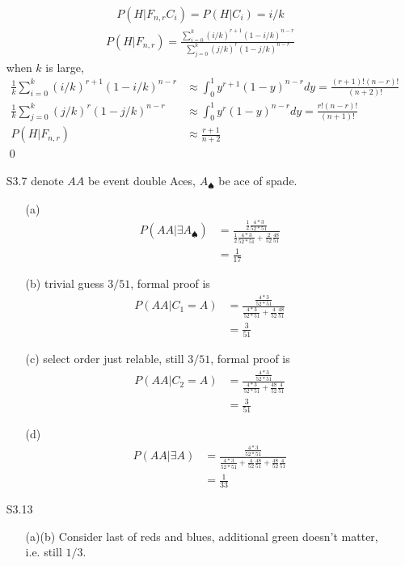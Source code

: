 \documentclass[paper=a4, fontsize=11pt]{scrartcl} %
\numberwithin{equation}{section} %
\numberwithin{figure}{section} %
\numberwithin{table}{section} %
\begin{document}
\begin{itemize}
\begin{align}
		P(H|F_{n,r} C_i) = P(H|C_i) = i/k
	\end{align}
	\begin{align}
		P(H|F_{n,r}) = \frac{\sum_{i=0}^k(i/k)^{r+1}(1-i/k)^{n-r} }{\sum_{j=0}^k(j/k)^r(1-j/k)^{n-r}}
	\end{align}
	when $k$ is large,
	\begin{align}
		\frac{1}{k}\sum_{i=0}^k(i/k)^{r+1}(1-i/k)^{n-r} &\approx \int_0^1 y^{r+1}(1-y)^{n-r}dy = \frac{(r+1)!(n-r)!}{(n+2)!}\\
		\frac{1}{k}\sum_{j=0}^k(j/k)^{r}(1-j/k)^{n-r} &\approx \int_0^1 y^{r}(1-y)^{n-r}dy = \frac{r!(n-r)!}{(n+1)!}\\
		P(H|F_{n,r}) &\approx \frac{r+1}{n+2}
	\end{align}\qed
	\item[S3.7] denote $AA$ be event double Aces, $A_\spadesuit$ be ace of spade.
	\begin{itemize}
		\item[(a)]
		\begin{align}
			P(AA|\exists A_\spadesuit) &= \frac{\frac{1}{2} \frac{4*3}{52*51}}{\frac{1}{2} \frac{4*3}{52*51} + \frac{2}{52}\frac{48}{51}}\\
				&= \frac{1}{17}
		\end{align}
		\item[(b)] trivial guess $3/51$, formal proof is
		\begin{align}
			P(AA|C_1=A) &= \frac{\frac{4*3}{52*51}}{\frac{4*3}{52*51} + \frac{4}{52}\frac{48}{51}}\\
					&= \frac{3}{51}
		\end{align}
		\item[(c)] select order just relable, still $3/51$, formal proof is
		\begin{align}
			P(AA|C_2=A) &= \frac{\frac{4*3}{52*51}}{\frac{4*3}{52*51} + \frac{48}{52}\frac{4}{51}}\\
					&= \frac{3}{51}
		\end{align}
		\item[(d)] 
		\begin{align}
			P(AA|\exists A) &= \frac{\frac{4*3}{52*51}}{ \frac{4*3}{52*51} + \frac{4}{52}\frac{48}{51} + \frac{48}{52}\frac{4}{51} } \\
				&=\frac{1}{33}
		\end{align}
	\end{itemize}
	\item[S3.13] 
	\begin{itemize}
		\item[(a)(b)] Consider last of reds and blues, additional green doesn't matter, i.e. still $1/3$.

\end{itemize}
\end{itemize}
\end{document}
